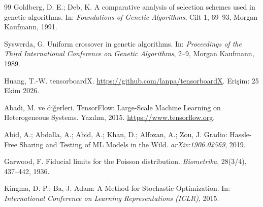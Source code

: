\documentclass[11pt,a4paper]{article}
\begin{document}
\begin{thebibliography}{99}
Goldberg, D. E.; Deb, K. A comparative analysis of selection schemes used in genetic algorithms. In: \textit{Foundations of Genetic Algorithms}, Cilt 1, 69--93, Morgan Kaufmann, 1991.

Syswerda, G. Uniform crossover in genetic algorithms. In: \textit{Proceedings of the Third International Conference on Genetic Algorithms}, 2--9, Morgan Kaufmann, 1989.

Huang, T.-W. tensorboardX. \url{https://github.com/lanpa/tensorboardX}. Erişim: 25 Ekim 2026.

Abadi, M. ve diğerleri. TensorFlow: Large-Scale Machine Learning on Heterogeneous Systems. Yazılım, 2015. \url{https://www.tensorflow.org}.

Abid, A.; Abdalla, A.; Abid, A.; Khan, D.; Alfozan, A.; Zou, J. Gradio: Hassle-Free Sharing and Testing of ML Models in the Wild. \textit{arXiv:1906.02569}, 2019.

Garwood, F. Fiducial limits for the Poisson distribution. \textit{Biometrika}, 28(3/4), 437--442, 1936.

Kingma, D. P.; Ba, J. Adam: A Method for Stochastic Optimization. In: \textit{International Conference on Learning Representations (ICLR)}, 2015.

\end{thebibliography}
\end{document}
